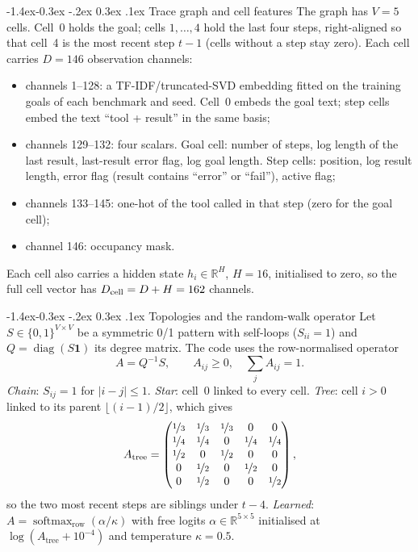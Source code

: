 \documentclass[10pt,twocolumn,letterpaper]{article}
\makeatletter
\renewcommand\subsection{\@startsection{subsection}{2}{\z@}%
  {-1.4ex\@plus -0.3ex \@minus -.2ex}%
  {0.3ex \@plus .1ex}%
  {\normalfont\normalsize\bfseries}}
\makeatother
\begin{document}
\subsection{Trace graph and cell features}\label{sec:cells}
The graph has $V{=}5$ cells. Cell~0 holds the goal; cells $1,\dots,4$ hold the last four steps, right-aligned so that cell~4 is the most recent step $t{-}1$ (cells without a step stay zero). Each cell carries $D{=}146$ observation channels:
\begin{itemize}[leftmargin=1.2em, itemsep=0.05em]
  \item channels 1--128: a TF-IDF/truncated-SVD embedding fitted on the training goals of each benchmark and seed. Cell~0 embeds the goal text; step cells embed the text ``tool + result'' in the same basis;
  \item channels 129--132: four scalars. Goal cell: number of steps, log length of the last result, last-result error flag, log goal length. Step cells: position, log result length, error flag (result contains ``error'' or ``fail''), active flag;
  \item channels 133--145: one-hot of the tool called in that step (zero for the goal cell);
  \item channel 146: occupancy mask.
\end{itemize}
Each cell also carries a hidden state $h_i \in \mathbb{R}^{H}$, $H{=}16$, initialised to zero, so the full cell vector has $D_{\text{cell}} = D + H = 162$ channels.

\subsection{Topologies and the random-walk operator}\label{sec:topologies}
Let $S \in \{0,1\}^{V\times V}$ be a symmetric 0/1 pattern with self-loops ($S_{ii}=1$) and $Q = \operatorname{diag}(S\mathbf{1})$ its degree matrix. The code uses the row-normalised operator
\begin{equation}\label{eq:rownorm}
A = Q^{-1} S, \qquad A_{ij} \ge 0, \quad \textstyle\sum_j A_{ij} = 1 .
\end{equation}
\emph{Chain}: $S_{ij}=1$ for $|i-j|\le1$. \emph{Star}: cell~0 linked to every cell. \emph{Tree}: cell $i>0$ linked to its parent $\lfloor (i-1)/2\rfloor$, which gives
\begin{equation}\label{eq:atree}
A_{\text{tree}} = \begin{pmatrix}
\nicefrac13 & \nicefrac13 & \nicefrac13 & 0 & 0\\
\nicefrac14 & \nicefrac14 & 0 & \nicefrac14 & \nicefrac14\\
\nicefrac12 & 0 & \nicefrac12 & 0 & 0\\
0 & \nicefrac12 & 0 & \nicefrac12 & 0\\
0 & \nicefrac12 & 0 & 0 & \nicefrac12
\end{pmatrix},
\end{equation}
so the two most recent steps are siblings under $t{-}4$. \emph{Learned}: $A = \operatorname{softmax}_{\text{row}}(\alpha/\kappa)$ with free logits $\alpha\in\mathbb{R}^{5\times5}$ initialised at $\log(A_{\text{tree}}+10^{-4})$ and temperature $\kappa{=}0.5$.
\end{document}
